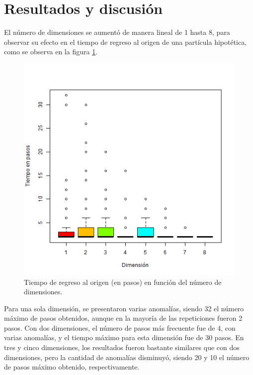 \documentclass{article}
\begin{document}
\section{Resultados y discusión}
El número de dimensiones se aumentó de manera lineal de 1 hasta 8, para observar su efecto en el tiempo de regreso al origen de una partícula hipotética, como se observa en la figura \ref{figura1}.
\begin{figure}[ptb]
\begin{center}
\includegraphics[width=\linewidth]{Practica1.png}
\end{center}
\caption{Tiempo de regreso al origen (en pasos) en función del número de dimensiones.\label{figura1}}
\end{figure}
Para una sola dimensión, se presentaron varias anomalías, siendo 32 el número máximo de pasos obtenidos, aunque en la mayoría de las repeticiones fueron 2 pasos. Con dos dimensiones, el número de pasos más frecuente fue de 4, con varias anomalías, y el tiempo máximo para esta dimensión fue de 30 pasos. En tres y cinco dimensiones, los resultados fueron bastante similares que con dos dimensiones, pero la cantidad de anomalías disminuyó, siendo 20 y 10 el número de pasos máximo obtenido, respectivamente. 
\end{document}
